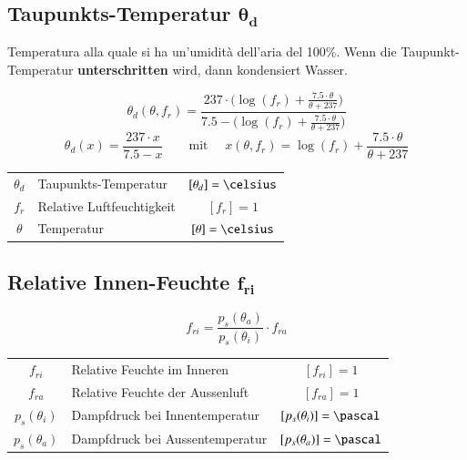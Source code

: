 \subsection[Taupunkts-Temperatur]{Taupunkts-Temperatur $\boldsymbol{\theta_d}$}

Temperatura alla quale si ha un'umidità dell'aria del 100\%. \smallskip
Wenn die Taupunkt-Temperatur \textbf{unterschritten} wird, dann kondensiert Wasser.

$$ \boxed{ \theta_d (\theta, f_r) = \frac{237 \cdot \Big( \log(f_r) + \frac{7.5 \cdot \theta}{\theta + 237}    \Big)}{7.5 - \Big( \log(f_r) + \frac{7.5 \cdot \theta }{\theta + 237} \Big) } } $$
$$ \boxed{ \theta_d (x) = \frac{237 \cdot x}{7.5 - x}  \qquad  \text{mit } \quad  x(\theta, f_r) = \log(f_r) + \frac{7.5 \cdot \theta}{\theta + 237} } $$


\begin{tabular}{c l c}
	$\theta_d$	& Taupunkts-Temperatur 		& $[\theta_d] = \celsius$ 	\\
	$f_r$ 		& Relative Luftfeuchtigkeit & $[f_r] = 1$ 				\\
	$\theta$ 	& Temperatur 				& $[\theta] = \celsius$
\end{tabular}


\subsection[Relative Innen-Feuchte]{Relative Innen-Feuchte $\boldsymbol{f_{ri}}$}

\vspace{-0.2cm}

$$ \boxed{ f_{ri} = \frac{p_s(\theta_a)}{p_s(\theta_i)} \cdot f_{ra} } $$

\begin{tabular}{c l c}
	$f_{ri}$ 		& Relative Feuchte im Inneren 		& $[f_{ri}] = 1$ 				\\
	$f_{ra}$ 		& Relative Feuchte der Aussenluft 	& $[f_{ra}] = 1$ 				\\
	$p_s(\theta_i)$ & Dampfdruck bei Innentemperatur 	& $[p_s(\theta_i)] = \pascal$ 	\\
	$p_s(\theta_a)$ & Dampfdruck bei Aussentemperatur 	&  $[p_s(\theta_a)] = \pascal$
\end{tabular}
